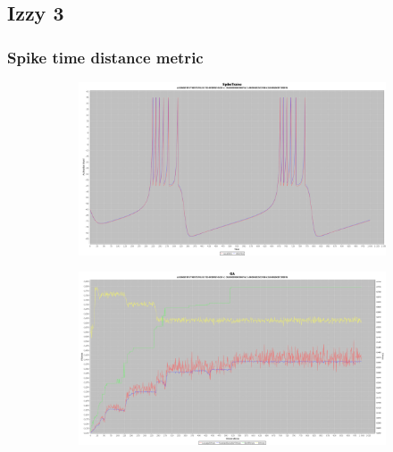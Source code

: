 \documentclass[12pt]{article}
\begin{document}
	\subsection{Izzy 3}
		\subsubsection{Spike time distance metric}
			\begin{figure}[H]
				\centering
					\begin{subfigure}{.5\textwidth}
						\centering
						\includegraphics[width=\linewidth]{./../images/izzy3/time/plot.png}
						
						\label{fig:sub7a}
					\end{subfigure}%
					\begin{subfigure}{.5\textwidth}
						\centering
						\includegraphics[width=\linewidth]{./../images/izzy3/time/prog.png}
						
						\label{fig:sub7b}
					\end{subfigure}
					
					\label{fig:plot7}
			\end{figure}
			
\end{document}
